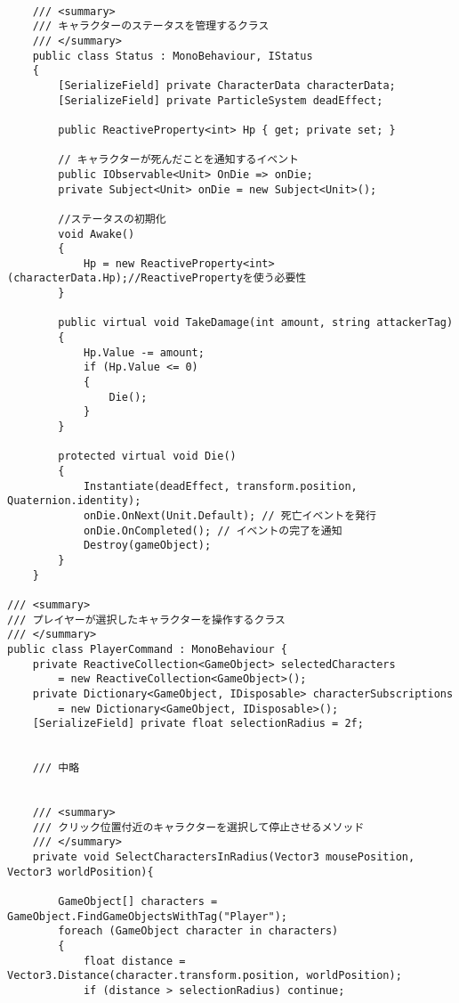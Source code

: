 \documentclass[dvipdfmx,fleqn,article]{jlreq}
\begin{document}
\begin{lstlisting}[language=CSharp, caption=Observerパターンの実装例]

    /// <summary>
    /// キャラクターのステータスを管理するクラス
    /// </summary>
    public class Status : MonoBehaviour, IStatus
    {
        [SerializeField] private CharacterData characterData;
        [SerializeField] private ParticleSystem deadEffect;
    
        public ReactiveProperty<int> Hp { get; private set; }
    
        // キャラクターが死んだことを通知するイベント
        public IObservable<Unit> OnDie => onDie;
        private Subject<Unit> onDie = new Subject<Unit>();
    
        //ステータスの初期化
        void Awake()
        {
            Hp = new ReactiveProperty<int>(characterData.Hp);//ReactivePropertyを使う必要性
        }

        public virtual void TakeDamage(int amount, string attackerTag)
        {
            Hp.Value -= amount;
            if (Hp.Value <= 0)
            {
                Die();
            }
        }
    
        protected virtual void Die()
        {
            Instantiate(deadEffect, transform.position, Quaternion.identity);
            onDie.OnNext(Unit.Default); // 死亡イベントを発行
            onDie.OnCompleted(); // イベントの完了を通知
            Destroy(gameObject);
        }
    }

/// <summary>
/// プレイヤーが選択したキャラクターを操作するクラス
/// </summary>
public class PlayerCommand : MonoBehaviour {
    private ReactiveCollection<GameObject> selectedCharacters 
        = new ReactiveCollection<GameObject>();
    private Dictionary<GameObject, IDisposable> characterSubscriptions 
        = new Dictionary<GameObject, IDisposable>();
    [SerializeField] private float selectionRadius = 2f;


    /// 中略


    /// <summary>
    /// クリック位置付近のキャラクターを選択して停止させるメソッド
    /// </summary>
    private void SelectCharactersInRadius(Vector3 mousePosition, Vector3 worldPosition){

        GameObject[] characters = GameObject.FindGameObjectsWithTag("Player");
        foreach (GameObject character in characters)
        {
            float distance = Vector3.Distance(character.transform.position, worldPosition);
            if (distance > selectionRadius) continue;


\end{lstlisting}
\end{document}
